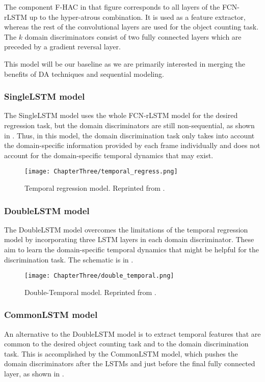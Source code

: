 The component F-HAC in that figure corresponds to all layers of the FCN-rLSTM up to the hyper-atrous combination. It is used as a feature extractor, whereas the rest of the convolutional layers are used for the object counting task. The $k$ domain discriminators consist of two fully connected layers which are preceded by a gradient reversal layer.

This model will be our baseline as we are primarily interested in merging the benefits of DA techniques and sequential modeling.

\subsubsection{SingleLSTM model}
The SingleLSTM model uses the whole FCN-rLSTM model for the desired regression task, but the domain discriminators are still non-sequential, as shown in . Thus, in this model, the domain discrimination task only takes into account the domain-specific information provided by each frame individually and does not account for the domain-specific temporal dynamics that may exist.

\begin{figure}[h!]
	\centering
	\texttt{[image: ChapterThree/temporal\_regress.png]}
	\caption{Temporal regression model. Reprinted from \citet{ThesisFrancisco}.}
	\label{fig:temporal_regress_model}
\end{figure}

\subsubsection{DoubleLSTM model}
The DoubleLSTM model overcomes the limitations of the temporal regression model by incorporating three LSTM layers in each domain discriminator. These aim to learn the domain-specific temporal dynamics that might be helpful for the discrimination task. The schematic is in .

\begin{figure}[!ht]
	\centering
	\texttt{[image: ChapterThree/double\_temporal.png]}
	\caption{Double-Temporal model. Reprinted from \citet{ThesisFrancisco}.}
	\label{fig:double_temporal_model}
\end{figure}

\subsubsection{CommonLSTM model}
An alternative to the DoubleLSTM model is to extract temporal features that are common to the desired object counting task and to the domain discrimination task. This is accomplished by the CommonLSTM model, which pushes the domain discriminators after the LSTMs and just before the final fully connected layer, as shown in .

